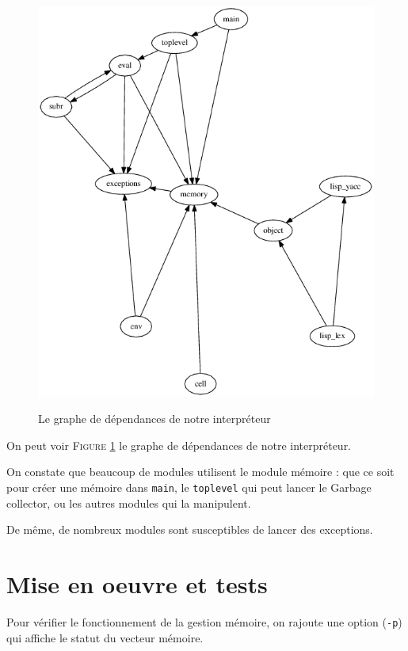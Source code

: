 \documentclass[12pt]{article}
\def\code #1{\lstinline{#1}}
\begin{document}
\begin{figure}
  \begin{center}
    \includegraphics[scale=0.4]{graph.png}
    \label{fig:dep}
    \caption{Le graphe de dépendances de notre interpréteur}
  \end{center}
\end{figure}


On peut voir \textsc{Figure} \ref{fig:dep} le graphe de dépendances de notre interpréteur.

On constate que beaucoup de modules utilisent le module mémoire : que ce soit pour créer une mémoire dans \code{main}, le \code{toplevel} qui peut lancer le Garbage collector, ou les autres modules qui la manipulent.

De même, de nombreux modules sont susceptibles de lancer des exceptions.

\section{Mise en oeuvre et tests}

Pour vérifier le fonctionnement de la gestion mémoire, on rajoute une option (\code{-p}) qui affiche le statut du vecteur mémoire.
\end{document}
